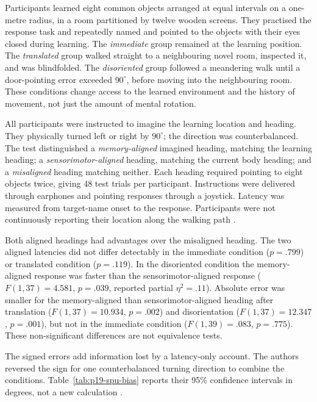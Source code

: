 Participants learned eight common objects arranged at equal intervals
on a one-metre radius, in a room partitioned by twelve wooden screens.
They practised the response task and repeatedly named and pointed to
the objects with their eyes closed during learning.
The \emph{immediate} group remained at the learning position.
The \emph{translated} group walked straight to a neighbouring novel
room, inspected it, and was blindfolded.
The \emph{disoriented} group followed a meandering walk until a
door-pointing error exceeded \(90^\circ\), before moving into the
neighbouring room. These conditions change access to the learned
environment and the history of movement, not just the amount of
mental rotation.

All participants were instructed to imagine the learning location
and heading. They physically turned left or right by \(90^\circ\);
the direction was counterbalanced. The test distinguished a
\emph{memory-aligned} imagined heading, matching the learning heading;
a \emph{sensorimotor-aligned} heading, matching the current body
heading; and a \emph{misaligned} heading matching neither.
Each heading required pointing to eight objects twice, giving 48
test trials per participant. Instructions were delivered through
earphones and pointing responses through a joystick.
Latency was measured from target-name onset to the response.
Participants were not continuously reporting their location along
the walking path \cite[Procedure]{LiuXiao2018UpdatingSPU}.

Both aligned headings had advantages over the misaligned heading.
The two aligned latencies did not differ detectably in the immediate
condition (\(p=.799\)) or translated condition (\(p=.119\)).
In the disoriented condition the memory-aligned response was faster
than the sensorimotor-aligned response
(\(F(1,37)=4.581\), \(p=.039\), reported partial
\(\eta^2=.11\)). Absolute error was smaller for the memory-aligned
than sensorimotor-aligned heading after translation
(\(F(1,37)=10.934\), \(p=.002\)) and disorientation
(\(F(1,37)=12.347\), \(p=.001\)), but not in the immediate condition
(\(F(1,39)=.083\), \(p=.775\)).
These non-significant differences are not equivalence tests.

The signed errors add information lost by a latency-only account.
The authors reversed the sign for one counterbalanced turning
direction to combine the conditions. Table~\ref{tab:p19-spu-bias}
reports their 95\% confidence intervals in degrees, not a new
calculation \cite[Results, pp.\ 5--6]{LiuXiao2018UpdatingSPU}.

